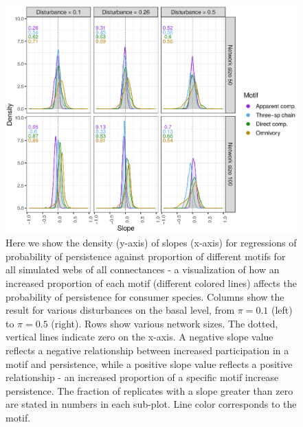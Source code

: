 \documentclass[12pt]{article}
\begin{document}
\begin{spacing}{2.0}
    
    \begin{figure}[hb!]
        \centering
            \includegraphics[width=\textwidth]{figures/prop_dens_bp_vs_S_allC.eps}
            \caption{Here we show the density (y-axis) of slopes (x-axis) for regressions of probability of persistence against proportion of different motifs for all simulated webs of all connectances - a visualization of how an increased proportion of each motif (different colored lines) affects the probability of persistence for consumer species. Columns show the result for various disturbances on the basal level, from $\pi = 0.1$ (left) to $\pi = 0.5$ (right). Rows show various network sizes. The dotted, vertical lines indicate zero on the x-axis. A negative slope value reflects a negative relationship between increased participation in a motif and persistence, while a positive slope value reflects a positive relationship - an increased proportion of a specific motif increase persistence. The fraction of replicates with a slope greater than zero are stated in numbers in each sub-plot. Line color corresponds to the motif. }
            \label{fig:density_prop_S}
        \end{figure}    

    
    

\end{spacing}
\end{document}
